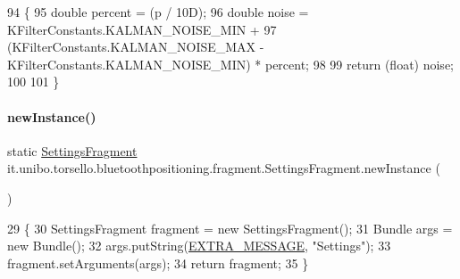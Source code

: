 \begin{DoxyCode}
94                                                    \{
95         \textcolor{keywordtype}{double} percent = (p / 10D);
96         \textcolor{keywordtype}{double} noise = KFilterConstants.KALMAN\_NOISE\_MIN +
97                 (KFilterConstants.KALMAN\_NOISE\_MAX - KFilterConstants.KALMAN\_NOISE\_MIN) * percent;
98 
99         \textcolor{keywordflow}{return} (\textcolor{keywordtype}{float}) noise;
100 
101     \}
\end{DoxyCode}
\hypertarget{classit_1_1unibo_1_1torsello_1_1bluetoothpositioning_1_1fragment_1_1SettingsFragment_a4eb69c78cde2ba119eb62453688280f5_a4eb69c78cde2ba119eb62453688280f5}{}\label{classit_1_1unibo_1_1torsello_1_1bluetoothpositioning_1_1fragment_1_1SettingsFragment_a4eb69c78cde2ba119eb62453688280f5_a4eb69c78cde2ba119eb62453688280f5} 
\paragraph{\texorpdfstring{new\+Instance()}{newInstance()}}
{\footnotesize\ttfamily static \hyperlink{classit_1_1unibo_1_1torsello_1_1bluetoothpositioning_1_1fragment_1_1SettingsFragment}{Settings\+Fragment} it.\+unibo.\+torsello.\+bluetoothpositioning.\+fragment.\+Settings\+Fragment.\+new\+Instance (\begin{DoxyParamCaption}{ }\end{DoxyParamCaption})\hspace{0.3cm}{\ttfamily [static]}}


\begin{DoxyCode}
29                                                  \{
30         SettingsFragment fragment = \textcolor{keyword}{new} SettingsFragment();
31         Bundle args = \textcolor{keyword}{new} Bundle();
32         args.putString(\hyperlink{classit_1_1unibo_1_1torsello_1_1bluetoothpositioning_1_1fragment_1_1SettingsFragment_a3f3c627008cd1e176afc52642c73fd93_a3f3c627008cd1e176afc52642c73fd93}{EXTRA\_MESSAGE}, \textcolor{stringliteral}{"Settings"});
33         fragment.setArguments(args);
34         \textcolor{keywordflow}{return} fragment;
35     \}
\end{DoxyCode}
\hypertarget{classit_1_1unibo_1_1torsello_1_1bluetoothpositioning_1_1fragment_1_1SettingsFragment_a7de90efb25e655078f5f8984f7c6d628_a7de90efb25e655078f5f8984f7c6d628}{}\label{classit_1_1unibo_1_1torsello_1_1bluetoothpositioning_1_1fragment_1_1SettingsFragment_a7de90efb25e655078f5f8984f7c6d628_a7de90efb25e655078f5f8984f7c6d628} 
